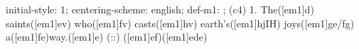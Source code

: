 initial-style: 1;
centering-scheme: english;
def-m1: \grealign;
(c4) 1. The([em1]d) saints([em1]ev) who([em1]fv) casts([em1]hv) earth's([em1]hjIH) joys([em1]ge/fg) a([em1]fe)way.([em1]e) (::) ([em1]ef)([em1]ede)